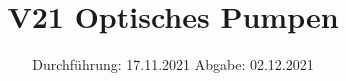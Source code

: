 

\subject{Fortgeschrittenenpraktikum}
\title{V21 Optisches Pumpen}
\date{%
  Durchführung: 17.11.2021
  \hspace{3em}
  Abgabe: 02.12.2021
}



\maketitle
\thispagestyle{empty}
\tableofcontents
\newpage






%

\printbibliography{}




